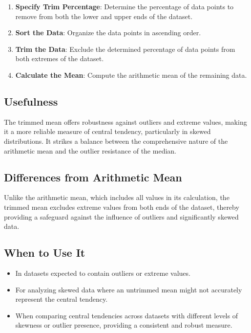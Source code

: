 \documentclass[12pt]{article}
\begin{document}
\begin{enumerate}
    \item \textbf{Specify Trim Percentage}: Determine the percentage of data points to remove from both the lower and upper ends of the dataset.
    \item \textbf{Sort the Data}: Organize the data points in ascending order.
    \item \textbf{Trim the Data}: Exclude the determined percentage of data points from both extremes of the dataset.
    \item \textbf{Calculate the Mean}: Compute the arithmetic mean of the remaining data.
\end{enumerate}

\subsection{Usefulness}

The trimmed mean offers robustness against outliers and extreme values, making it a more reliable measure of central tendency, particularly in skewed distributions. It strikes a balance between the comprehensive nature of the arithmetic mean and the outlier resistance of the median.

\subsection{Differences from Arithmetic Mean}

Unlike the arithmetic mean, which includes all values in its calculation, the trimmed mean excludes extreme values from both ends of the dataset, thereby providing a safeguard against the influence of outliers and significantly skewed data.

\subsection{When to Use It}

\begin{itemize}
    \item In datasets expected to contain outliers or extreme values.
    \item For analyzing skewed data where an untrimmed mean might not accurately represent the central tendency.
    \item When comparing central tendencies across datasets with different levels of skewness or outlier presence, providing a consistent and robust measure.
\end{itemize}
\end{document}
